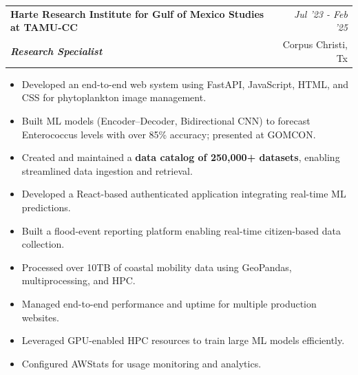 \documentclass[a4paper,11pt]{article}
\makeatletter
\newcommand{\resumeSubheading}[4]{
\vspace{0.5mm}\item
    \begin{tabular*}{0.98\textwidth}[t]{l@{\extracolsep{\fill}}r}
        \textbf{#1} & \textit{\footnotesize{#4}} \\
        \textit{\footnotesize{#3}} &  \footnotesize{#2}\\
    \end{tabular*}
    \vspace{-2.4mm}
}
\newcommand{\resumeItemListStart}{\begin{itemize}[leftmargin=*,labelsep=1mm,itemsep=0.5mm]}
\newcommand{\resumeItemListEnd}{\end{itemize}\vspace{-2mm}}
\makeatother
\begin{document}
{    \resumeSubheading
      {{Harte Research Institute for Gulf of Mexico Studies at TAMU-CC }}{Corpus Christi, Tx }
      {\textbf{Research Specialist} }{Jul '23 - Feb '25 }
      \resumeItemListStart
        \item Developed an end-to-end web system using FastAPI, JavaScript, HTML, and CSS for phytoplankton image management.
        \item Built ML models (Encoder--Decoder, Bidirectional CNN) to forecast Enterococcus levels with over 85\% accuracy; presented at GOMCON.
        \item Created and maintained a \textbf{data catalog of 250,000+ datasets}, enabling streamlined data ingestion and retrieval.
        \item Developed a React-based authenticated application integrating real-time ML predictions.
        \item Built a flood-event reporting platform enabling real-time citizen-based data collection.
        \item Processed over 10TB of coastal mobility data using GeoPandas, multiprocessing, and HPC.
        \item Managed end-to-end performance and uptime for multiple production websites.
        \item Leveraged GPU-enabled HPC resources to train large ML models efficiently.
        \item Configured AWStats for usage monitoring and analytics.
      \resumeItemListEnd 
      
}
\end{document}
